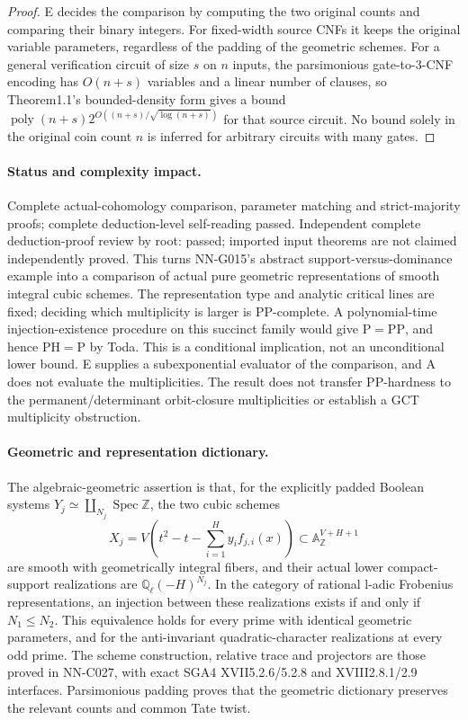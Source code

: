 \begin{proof}
E decides the comparison by computing the two original counts and comparing their binary integers. For fixed-width source CNFs it keeps the original variable parameters, regardless of the padding of the geometric schemes. For a general verification circuit of size $s$ on $n$ inputs, the parsimonious gate-to-3-CNF encoding has $O(n+s)$ variables and a linear number of clauses, so Theorem1.1's bounded-density form gives a bound $\operatorname{poly}(n+s)2^{O((n+s)/\sqrt{\log(n+s)})}$ for that source circuit. No bound solely in the original coin count $n$ is inferred for arbitrary circuits with many gates.
\end{proof}
\paragraph{Status and complexity impact.}
Complete actual-cohomology comparison, parameter matching and strict-majority proofs; complete deduction-level self-reading passed. Independent complete deduction-proof review by root: passed; imported input theorems are not claimed independently proved. This turns NN-G015's abstract support-versus-dominance example into a comparison of actual pure geometric representations of smooth integral cubic schemes. The representation type and analytic critical lines are fixed; deciding which multiplicity is larger is PP-complete. A polynomial-time injection-existence procedure on this succinct family would give $\mathrm P=\mathrm{PP}$, and hence $\mathrm{PH}=\mathrm P$ by Toda. This is a conditional implication, not an unconditional lower bound. E supplies a subexponential evaluator of the comparison, and A does not evaluate the multiplicities. The result does not transfer PP-hardness to the permanent/determinant orbit-closure multiplicities or establish a GCT multiplicity obstruction.

\paragraph{Geometric and representation dictionary.}
The algebraic-geometric assertion is that, for the explicitly padded Boolean systems $Y_j\simeq\coprod_{N_j}\operatorname{Spec}\mathbb Z$, the two cubic schemes
\[
 X_j=V\left(t^2-t-\sum_{i=1}^H y_i f_{j,i}(x)\right)
          \subset\mathbb A^{V+H+1}_\mathbb Z
\]
are smooth with geometrically integral fibers, and their actual lower compact-support realizations are $\mathbb Q_\ell(-H)^{N_j}$. In the category of rational l-adic Frobenius representations, an injection between these realizations exists if and only if $N_1\leq N_2$. This equivalence holds for every prime with identical geometric parameters, and for the anti-invariant quadratic-character realizations at every odd prime. The scheme construction, relative trace and projectors are those proved in NN-C027, with exact SGA4 XVII5.2.6/5.2.8 and XVIII2.8.1/2.9 interfaces. Parsimonious padding proves that the geometric dictionary preserves the relevant counts and common Tate twist.

